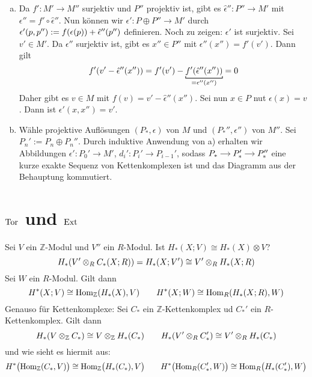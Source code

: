 \begin{beweis}
	\begin{enumerate}[a)]
		\item Da $f' \colon M' \to M''$ surjektiv und $P''$ projektiv ist, gibt es $\hat{\epsilon}'' \colon P'' \to M'$ mit $\epsilon'' = f' \circ \hat{\epsilon}''$.
		Nun können wir $\epsilon' \colon P \oplus P'' \to M'$ durch $\epsilon' (p,p'') := f \enbrace*{\epsilon(p)} + \hat{\epsilon}''(p'')$ definieren.
		Noch zu zeigen: $\epsilon'$ ist surjektiv. 
		Sei $v' \in M'$. Da $\epsilon''$ surjektiv ist, gibt es $x'' \in P''$ mit $\epsilon''(x'')=f'(v')$. Dann gilt
		\[
			f'\enbrace*{v' - \hat{\epsilon}''(x'')} = f'(v') - \Underbracket{f' \enbrace*{\hat{\epsilon}''(x'')}}{=\epsilon''(x'')} = 0
		\]
		Daher gibt es $v \in M$ mit $f(v)=v' - \hat{\epsilon}''(x'')$.
		Sei nun $x \in P$ nut $\epsilon(x)=v$.
		Dann ist $\epsilon'(x,x'')=v'$.
		\item Wähle projektive Auflösungen $(P_*,\epsilon)$ von $M$ und $(P_*'',\epsilon'')$ von $M''$.
		Sei $P_n' := P_n \oplus P_n''$.
		Durch induktive Anwendung von a) erhalten wir Abbildungen $\epsilon' \colon P_0' \to M'$, $d_i' \colon P_i' \to P_{i-1}'$, sodass $\begin{tikzcd}[cramped,sep=small]
			P_* \rar & P_*' \rar & P_*''
		\end{tikzcd}$ eine kurze exakte Sequenz von Kettenkomplexen ist und das Diagramm aus der Behauptung kommutiert.\qedhere
	\end{enumerate}
\end{beweis}
\newpage

\section[Tor und Ext]{$\Tor$ und $\Ext$} %
\label{sec:12}

\begin{frage}
	Sei $V$ ein $\mathbb{Z}$-Modul und $V''$ ein $R$-Modul. Ist $H_*(X;V) \cong H_*(X) \otimes V$? 
	\[
		H_* \enbrace*{V' \otimes_R C_*(X;R)}= H_*(X;V') \cong V' \otimes_R H_*(X;R)
	\]
	Sei $W$ ein $R$-Modul. Gilt dann
	\[
		H^*(X;V) \cong \Hom_\mathbb{Z}(H_*(X),V) \qquad H^*(X;W) \cong \Hom_R \enbrace*{H_*(X;R),W}
	\]
	Genauso für Kettenkomplexe: Sei $C_*$ ein $\mathbb{Z}$-Kettenkomplex ud $C_*'$ ein $R$-Kettenkomplex. Gilt dann
	\[
		H_* \enbrace*{V \otimes_\mathbb{Z} C_*} \cong V \otimes _\mathbb{Z} H_*(C_*) \qquad H_* \enbrace*{V' \otimes_R C_*'} \cong V' \otimes_R H_*(C_*)
	\]
	und wie sieht es hiermit aus:
	\[
		H^* \enbrace[\big]{\Hom_\mathbb{Z}(C_*,V)} \cong \Hom_\mathbb{Z} \enbrace[\big]{H_*(C_*),V} \qquad H^*\enbrace[\big]{\Hom_R(C_*',W)} \cong \Hom_R \enbrace[\big]{H_*(C_*'),W}
	\]
\end{frage}

